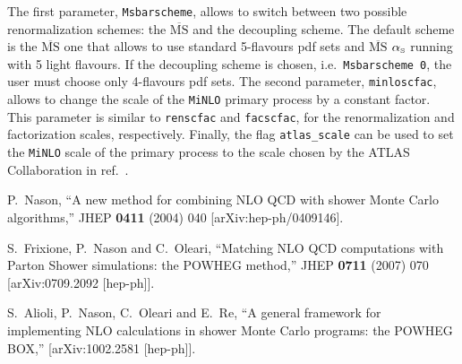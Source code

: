 \documentclass[paper]{JHEP3}
\newcommand\sss{\mathchoice%
{\displaystyle}%
{\scriptstyle}%
{\scriptscriptstyle}%
{\scriptscriptstyle}%
}
\newcommand\as{\alpha_{\sss\rm S}}
\begin{document}
{\\
\\
\\

\\


\\

\noindent The first parameter, {\tt Msbarscheme}, allows to switch between
two possible renormalization schemes: the $\overline{\mathrm{MS}}$ and the
decoupling scheme. The default scheme is the $\overline{\mathrm{MS}}$ one
that allows to use standard 5-flavours pdf sets and $\overline{\mathrm{MS}}$
$\as$ running with 5 light flavours. If the decoupling scheme is chosen,
i.e.~{\tt Msbarscheme 0}, the user must choose only 4-flavours pdf sets.
%
The second parameter, {\tt minloscfac}, allows to change the scale of the
{\tt MiNLO} primary process by a constant factor. This parameter is similar
to {\tt renscfac} and {\tt facscfac}, for the renormalization and
factorization scales, respectively.  Finally, the flag {\tt atlas\_scale} can
be used to set the {\tt MiNLO} scale of the primary process to the scale
chosen by the ATLAS Collaboration in ref.~\cite{Aad:2013vka}.

\begin{thebibliography}{10}

  P.~Nason,
  ``A new method for combining NLO QCD with shower Monte Carlo algorithms,''
  JHEP {\bf 0411} (2004) 040
  [arXiv:hep-ph/0409146].

  S.~Frixione, P.~Nason and C.~Oleari,
``Matching NLO QCD computations with Parton Shower simulations: the POWHEG
method,''
  JHEP {\bf 0711} (2007) 070
  [arXiv:0709.2092 [hep-ph]].

  S.~Alioli, P.~Nason, C.~Oleari and E.~Re,
``A general framework for implementing NLO calculations in shower Monte Carlo
  programs: the POWHEG BOX,''
  [arXiv:1002.2581 [hep-ph]].



\end{thebibliography}}
\end{document}
